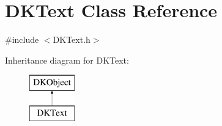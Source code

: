 \hypertarget{class_d_k_text}{\section{D\-K\-Text Class Reference}
\label{class_d_k_text}
}


{\ttfamily \#include $<$D\-K\-Text.\-h$>$}

Inheritance diagram for D\-K\-Text\-:\begin{figure}[H]
\begin{center}
\leavevmode
\includegraphics[height=2.000000cm]{class_d_k_text}
\end{center}
\end{figure}
